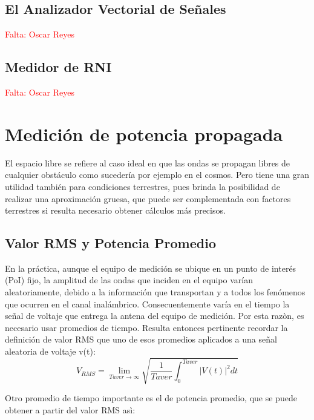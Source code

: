 \subsection{El Analizador Vectorial de Señales}
\textcolor{red}{Falta: Oscar Reyes }\\

\subsection{Medidor de RNI}
\textcolor{red}{Falta: Oscar Reyes}\\

\section{Medición de potencia propagada}

El espacio libre se refiere al caso ideal en que las ondas se propagan libres de cualquier obstáculo como sucedería por ejemplo en el cosmos. Pero tiene una gran utilidad también para condiciones terrestres, pues brinda la posibilidad de realizar una aproximación gruesa, que puede ser complementada con factores terrestres si resulta necesario obtener cálculos más precisos. \\

\subsection{Valor RMS y Potencia Promedio}

En la práctica, aunque el equipo de medición se ubique en un punto de interés (PoI) fijo, la amplitud de las ondas que inciden en el equipo varían aleatoriamente, debido a la información que transportan y a todos los fenómenos que ocurren en el canal inalámbrico. Consecuentemente varía en el tiempo la señal de voltaje que entrega la antena del equipo de medición. Por esta razòn, es necesario usar promedios de tiempo. Resulta entonces pertinente recordar la definición de valor RMS que uno de esos promedios aplicados a una señal aleatoria de voltaje v(t): \\

\begin{equation} \label{equ_sesenta_uno}
	 V_{RMS} = \lim_{Taver \to \infty} \sqrt{\dfrac{1}{Taver} \int_{0}^{Taver} |V(t)|^{2} dt} 
\end{equation}

Otro promedio de tiempo importante es el de potencia promedio, que se puede obtener a partir del valor RMS asì: \\

